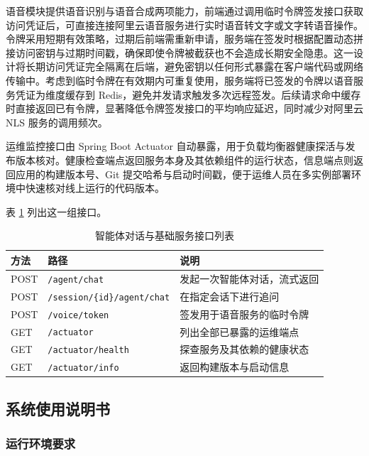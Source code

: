 \par 语音模块提供语音识别与语音合成两项能力，前端通过调用临时令牌签发接口获取访问凭证后，可直接连接阿里云语音服务进行实时语音转文字或文字转语音操作。令牌采用短期有效策略，过期后前端需重新申请，服务端在签发时根据配置动态拼接访问密钥与过期时间戳，确保即使令牌被截获也不会造成长期安全隐患。这一设计将长期访问凭证完全隔离在后端，避免密钥以任何形式暴露在客户端代码或网络传输中。考虑到临时令牌在有效期内可重复使用，服务端将已签发的令牌以语音服务凭证为维度缓存到 Redis，避免并发请求触发多次远程签发。后续请求命中缓存时直接返回已有令牌，显著降低令牌签发接口的平均响应延迟，同时减少对阿里云 NLS 服务的调用频次。

\par 运维监控接口由 Spring Boot Actuator 自动暴露，用于负载均衡器健康探活与发布版本核对。健康检查端点返回服务本身及其依赖组件的运行状态，信息端点则返回应用的构建版本号、Git 提交哈希与启动时间戳，便于运维人员在多实例部署环境中快速核对线上运行的代码版本。

\par 表 \ref{tab:api-agent} 列出这一组接口。

\begin{table}[htbp]
  \centering
  \caption{智能体对话与基础服务接口列表}
  \label{tab:api-agent}
  \begin{tabular}{p{2cm}p{5cm}p{6cm}}
    \hline
    方法 & 路径 & 说明 \\
    \hline
    POST & \texttt{/agent/chat} & 发起一次智能体对话，流式返回 \\
    POST & \texttt{/session/\{id\}/agent/chat} & 在指定会话下进行追问 \\
    POST & \texttt{/voice/token} & 签发用于语音服务的临时令牌 \\
    GET & \texttt{/actuator} & 列出全部已暴露的运维端点 \\
    GET & \texttt{/actuator/health} & 探查服务及其依赖的健康状态 \\
    GET & \texttt{/actuator/info} & 返回构建版本与启动信息 \\
    \hline
  \end{tabular}
\end{table}

\subsection{系统使用说明书}

\subsubsection{运行环境要求}

